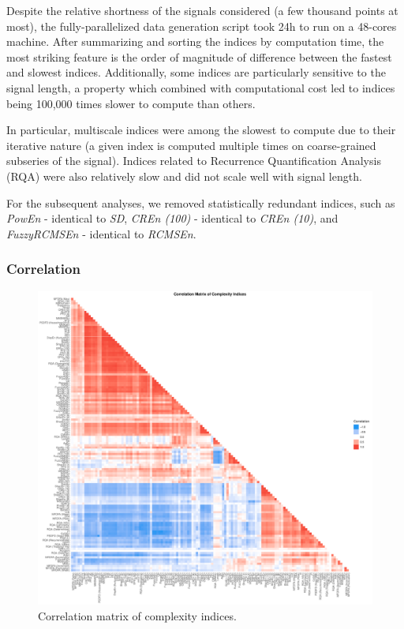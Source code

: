 \documentclass[
  man]{apa6}
\begin{document}
Despite the relative shortness of the signals considered (a few thousand points at most), the fully-parallelized data generation script took 24h to run on a 48-cores machine. After summarizing and sorting the indices by computation time, the most striking feature is the order of magnitude of difference between the fastest and slowest indices. Additionally, some indices are particularly sensitive to the signal length, a property which combined with computational cost led to indices being 100,000 times slower to compute than others.

In particular, multiscale indices were among the slowest to compute due to their iterative nature (a given index is computed multiple times on coarse-grained subseries of the signal). Indices related to Recurrence Quantification Analysis (RQA) were also relatively slow and did not scale well with signal length.

For the subsequent analyses, we removed statistically redundant indices, such as \emph{PowEn} - identical to \emph{SD}, \emph{CREn (100)} - identical to \emph{CREn (10)}, and \emph{FuzzyRCMSEn} - identical to \emph{RCMSEn}.

\hypertarget{correlation}{%
\subsubsection{Correlation}\label{correlation}}

\begin{figure}
\centering
\includegraphics{manuscript_files/figure-latex/correlation-1.pdf}
\caption{\label{fig:correlation}Correlation matrix of complexity indices.}
\end{figure}
\end{document}
